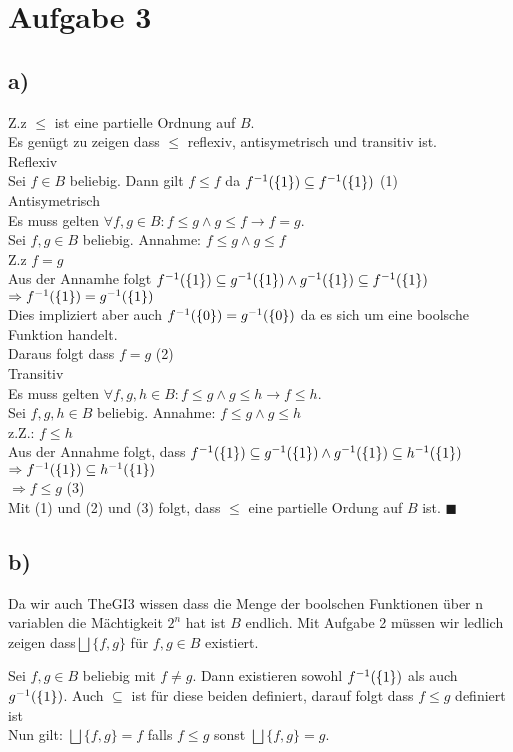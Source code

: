\section*{Aufgabe 3}
\subsection*{a)}

Z.z $\leq$ ist eine partielle Ordnung auf $B$.\\
Es genügt zu zeigen dass $\leq$ reflexiv, antisymetrisch und transitiv ist.\\

Reflexiv\\
Sei $f \in B$ beliebig. Dann gilt $f \leq f$ da $f^{-1}(\{1\}) \subseteq f^{-1}(\{1\})$ (1)\\

Antisymetrisch \\
Es muss gelten $\forall f,g \in B : f \leq g \land g \leq f \rightarrow f =g$.\\
Sei $f,g \in B$ beliebig. 
Annahme: $f \leq g \land g \leq f $ \\
Z.z $f =g$\\
Aus der Annamhe folgt $f^{-1}(\{1\}) \subseteq g^{-1}(\{1\}) \land g^{-1}(\{1\}) \subseteq f^{-1}(\{1\}) $\\
 $\Rightarrow f^{-1}(\{1\}) = g^{-1}(\{1\})$\\
Dies impliziert aber auch $f^{-1}(\{0\}) = g^{-1}(\{0\})$ da es sich um eine boolsche Funktion handelt.\\
Daraus folgt dass $f=g$ (2)\\

Transitiv\\
Es muss gelten $\forall f,g,h \in B : f \leq g \land g \leq h \rightarrow f \leq h$.\\
Sei $f,g,h \in B$ beliebig. 
Annahme: $f \leq g \land g \leq h$\\
z.Z.: $f \leq h$\\
Aus der Annahme folgt, dass  $f^{-1}(\{1\}) \subseteq g^{-1}(\{1\}) \land g^{-1}(\{1\}) \subseteq h^{-1}(\{1\})$\\
$\Rightarrow f^{-1}(\{1\}) \subseteq h^{-1}(\{1\})$\\
$\Rightarrow f \leq g$ (3)\\

Mit (1) und (2) und (3) folgt, dass $\leq$ eine partielle Ordung auf $B$ ist. $\blacksquare$

\subsection*{b)}
Da wir auch TheGI3 wissen dass die Menge der boolschen Funktionen über n variablen die Mächtigkeit $2^n$ hat ist $B$ endlich.
Mit Aufgabe 2 müssen wir ledlich zeigen dass$ \bigsqcup \{f,g\}$ für $f,g \in B$ existiert.

Sei $f,g \in B$ beliebig mit $f \neq g$. 
Dann existieren sowohl $f^{-1}(\{1\})$ als auch $g^{-1}(\{1\})$. Auch $\subseteq$ ist für diese beiden definiert, darauf folgt dass $f \leq g$ definiert ist\\
Nun gilt:
$ \bigsqcup \{f,g\}= f$ falls $f \leq g$ sonst 
$ \bigsqcup \{f,g\}= g$.


